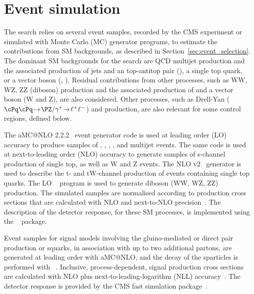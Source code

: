 \section{Event simulation}
\label{sec:event_simulation}

The search relies on several event samples, recorded by the CMS
experiment or simulated with Monte Carlo (MC) generator programs, to
estimate the contributions from SM backgrounds, as described in
Section~\ref{sec:event_selection}.
The dominant SM backgrounds for the search are QCD multijet production
and the associated production of jets and an top-antitop pair
(\ttbar), a single top quark, or a vector boson (\wlnu,
\znunu). Residual contributions from other processes, such as WW, WZ,
ZZ (diboson) production and the associated production of \ttbar and a
vector boson ({\ttbar}W and {\ttbar}Z), are also considered. Other
processes, such as Drell-Yan ($\cPq\bar{\cPq}\!  \rightarrow\!
\PZ/\gamma^*\!  \rightarrow\!  \ell^+\ell^-$) and \gj production, are
also relevant for some control regions, defined below.

The  aMC@NLO 2.2.2~\cite{Alwall2014} event generator code is
used at leading order (LO) accuracy to produce samples of \wj, \zj,
\gj, \ttbar, and multijet events. The same code is used at
next-to-leading order (NLO) accuracy to generate samples of s-channel
production of single top, as well as {\ttbar}W and {\ttbar}Z
events. The NLO \POWHEG v2~\cite{powheg, powheg_top_Wt} generator is
used to describe the t- and tW-channel production of events containing
single top quarks. The LO ~\cite{pythia} program is used to
generate diboson (WW, WZ, ZZ) production. The simulated samples are
normalised according to production cross sections that are calculated
with NLO and next-to-NLO precision~\cite{Alwall2014, wphys, fewz,
  wwxs, top++, nlotop, powheg_top_Wt}. The description of the detector
response, for these SM processes, is implemented using the
\GEANTfour~\cite{geant} package.

Event samples for signal models involving the gluino-mediated or
direct pair production or squarks, in association with up to two
additional partons, are generated at leading order with 
aMC@NLO, and the decay of the sparticles is performed with ~\cite{pythia}. Inclusive, process-dependent, signal production
cross sections are calculated with NLO plus next-to-leading-logarithm
(NLL) accuracy~\cite{Beenakker:1996ch, PhysRevLett.102.111802,
  PhysRevD.80.095004, 1126-6708-2009-12-041,
  doi:10.1142/S0217751X11053560, susynlo}. The detector response is
provided by the CMS fast simulation package~\cite{fastsim}.

